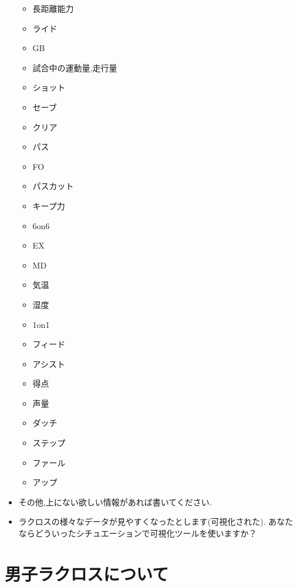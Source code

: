 \documentclass[sotsuron]{kuee}
\begin{document}
\begin{itemize}
\begin{itemize}
				\item 長距離能力
				\item ライド
				\item GB
				\item 試合中の運動量,走行量
				\item ショット
				\item セーブ
				\item クリア
				\item パス
				\item FO
				\item パスカット
				\item キープ力
				\item 6on6
				\item EX
				\item MD
				\item 気温
				\item 湿度
				\item 1on1
				\item フィード
				\item アシスト
				\item 得点
				\item 声量
				\item ダッチ
				\item ステップ
				\item ファール
				\item アップ
			\end{itemize}
		\item その他,上にない欲しい情報があれば書いてください. 
		\item ラクロスの様々なデータが見やすくなったとします(可視化された).  あなたならどういったシチュエーションで可視化ツールを使いますか？
	\end{itemize}

\chapter{男子ラクロスについて}
\end{document}
